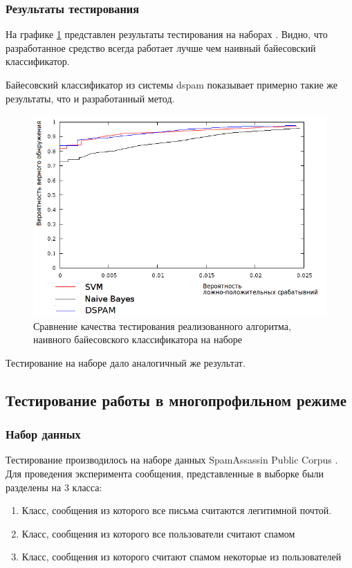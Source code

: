 \subsubsection{Результаты тестирования}
На графике \ref{SAPCBAYESSVM}  представлен результаты тестирования на наборах \cite{SAPC}. Видно, что разработанное средство всегда работает лучше чем наивный байесовский классификатор.

Байесовский классификатор из системы dspam показывает примерно такие же результаты, что и разработанный метод.
\begin{figure}[h]
\begin{center}
\includegraphics[width=15cm]{img/graphic}
\end{center}
\caption{Сравнение качества тестирования реализованного алгоритма, наивного байесовского классификатора на наборе\cite{SAPC}}
\label{SAPCBAYESSVM}
\end{figure}

Тестирование на наборе \cite{CEAS} дало аналогичный же результат.

\subsection{Тестирование работы в многопрофильном режиме}

\subsubsection{Набор данных}
Тестирование производилось на наборе данных SpamAssassin Public Corpus \cite{SAPC}.
Для проведения эксперимента сообщения, представленные в выборке были разделены на 3 класса:
\begin{enumerate}
\item Класс, сообщения из которого все письма считаются легитимной почтой.
\item Класс, сообщения из которого все пользователи считают спамом
\item Класс, сообщения из которого считают спамом некоторые из пользователей
\end{enumerate}


